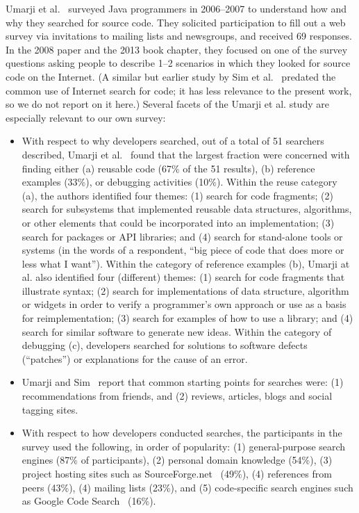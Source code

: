 \documentclass{casicswhitepaper}
\begin{document}
Umarji et al.~\cite{umarji_2008, umarji_2013} surveyed Java programmers in 2006--2007 to understand how and why they searched for source code.  They solicited participation to fill out a web survey via invitations to mailing lists and newsgroups, and received 69 responses.  In the 2008 paper and the 2013 book chapter, they focused on one of the survey questions asking people to describe 1--2 scenarios in which they looked for source code on the Internet.  (A similar but earlier study by Sim et al.~\cite{sim_1998} predated the common use of Internet search for code; it has less relevance to the present work, so we do not report on it here.)  Several facets of the Umarji et al. study are especially relevant to our own survey:

\begin{itemize}

\item With respect to why developers searched, out of a total of 51 searchers described, Umarji et al.~\cite{umarji_2008} found that the largest fraction were concerned with finding either (a) reusable code (67\% of the 51 results), (b) reference examples (33\%), or debugging activities (10\%).  Within the reuse category (a), the authors identified four themes: (1) search for code fragments; (2) search for subsystems that implemented reusable data structures, algorithms, or other elements that could be incorporated into an implementation; (3) search for packages or API libraries; and (4) search for stand-alone tools or systems (in the words of a respondent, ``big piece of code that does more or less what I want'').  Within the category of reference examples (b), Umarji at al. also identified four (different) themes: (1) search for code fragments that illustrate syntax; (2) search for implementations of data structure, algorithm or widgets in order to verify a programmer's own approach or use as a basis for reimplementation; (3) search for examples of how to use a library; and (4) search for similar software to generate new ideas.  Within the category of debugging (c), developers searched for solutions to software defects (``patches'') or explanations for the cause of an error.

\item Umarji and Sim~\cite{umarji_2013} report that common starting points for searches were: (1) recommendations from friends, and (2) reviews, articles, blogs and social tagging sites.

\item With respect to how developers conducted searches, the participants in the survey used the following, in order of popularity: (1) general-purpose search engines (87\% of participants), (2) personal domain knowledge (54\%), (3) project hosting sites such as SourceForge.net~\cite{} (49\%), (4) references from peers (43\%), (4) mailing lists (23\%), and (5) code-specific search engines such as Google Code Search~\cite{} (16\%).


\end{itemize}
\end{document}
